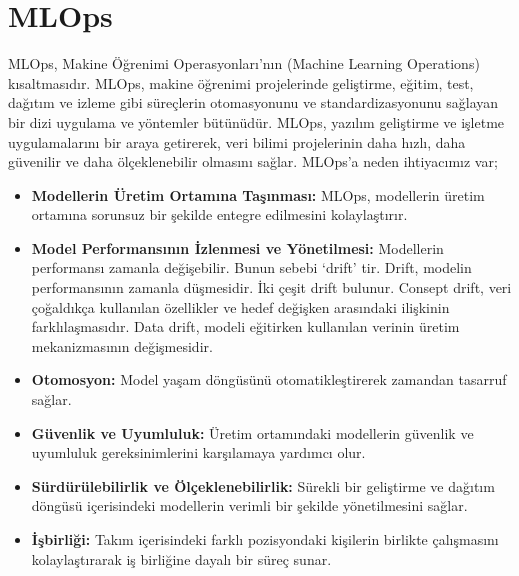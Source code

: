 \section{MLOps}
MLOps, Makine Öğrenimi Operasyonları'nın (Machine Learning Operations) kısaltmasıdır. MLOps, makine öğrenimi projelerinde geliştirme, eğitim, test, dağıtım ve izleme gibi süreçlerin otomasyonunu ve standardizasyonunu sağlayan bir dizi uygulama ve yöntemler bütünüdür. MLOps, yazılım geliştirme ve işletme uygulamalarını bir araya getirerek, veri bilimi projelerinin daha hızlı, daha güvenilir ve daha ölçeklenebilir olmasını sağlar. MLOps'a neden ihtiyacımız var;
\begin{itemize}
	\item \textbf{Modellerin Üretim Ortamına Taşınması:} MLOps, modellerin üretim ortamına sorunsuz bir şekilde entegre edilmesini kolaylaştırır.
	\item \textbf{Model Performansının İzlenmesi ve Yönetilmesi:} Modellerin performansı zamanla değişebilir. Bunun sebebi `drift' tir. Drift, modelin performansının zamanla düşmesidir. İki çeşit drift bulunur. Consept drift, veri çoğaldıkça kullanılan özellikler ve hedef değişken arasındaki ilişkinin farklılaşmasıdır. Data drift, modeli eğitirken kullanılan verinin üretim mekanizmasının değişmesidir.
	\item \textbf{Otomosyon:} Model yaşam döngüsünü otomatikleştirerek zamandan tasarruf sağlar.
	\item \textbf{Güvenlik ve Uyumluluk:} Üretim ortamındaki modellerin güvenlik ve uyumluluk gereksinimlerini karşılamaya yardımcı olur.
	\item \textbf{Sürdürülebilirlik ve Ölçeklenebilirlik:} Sürekli bir geliştirme ve dağıtım döngüsü içerisindeki modellerin verimli bir şekilde yönetilmesini sağlar.
	\item \textbf{İşbirliği:} Takım içerisindeki farklı pozisyondaki kişilerin birlikte çalışmasını kolaylaştırarak iş birliğine dayalı bir süreç sunar.
\end{itemize}

\newpage